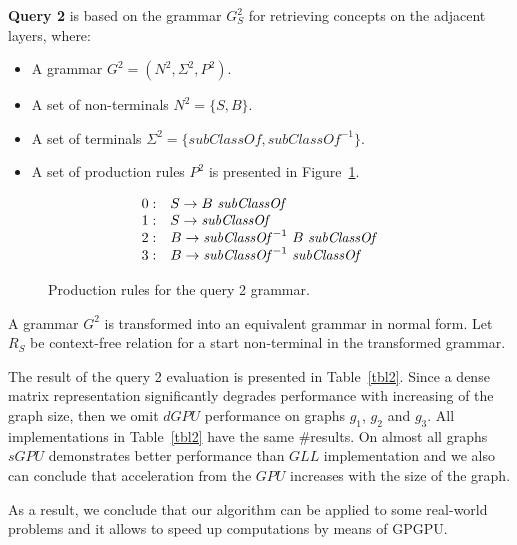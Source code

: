 \textbf{Query 2} is based on the grammar $G^2_S$ for retrieving concepts on the adjacent layers, where:
\begin{itemize}
    \item A grammar $G^2 = (N^2, \Sigma^2, P^2)$.
    \item A set of non-terminals $N^2 = \{S, B\}$.
    \item A set of terminals $\Sigma^2 = \{subClassOf, subClassOf^{-1}\}$.
    \item A set of production rules $P^2$ is presented in Figure~\ref{ProductionRulesQuery2}.
\end{itemize}

\begin{figure}[h]
   \[
\begin{array}{rl}
   0: & S \rightarrow B \ \text{\textit{subClassOf}} \\ 
   1: & S \rightarrow \text{\textit{subClassOf}} \\ 
   2: & B \rightarrow \text{\textit{subClassOf}}^{-1} \ B \ \text{\textit{subClassOf}} \\ 
   3: & B \rightarrow \text{\textit{subClassOf}}^{-1} \ \text{\textit{subClassOf}} \\ 
\end{array}
\]
\caption{Production rules for the query 2 grammar.}
\label{ProductionRulesQuery2}
\end{figure}

A grammar $G^2$ is transformed into an equivalent grammar in normal form. Let $R_S$ be context-free relation for a start non-terminal in the transformed grammar.

The result of the query 2 evaluation is presented in Table~\ref{tbl2}. Since a dense matrix representation significantly degrades performance with increasing of the graph size, then we omit $dGPU$ performance on graphs $g_1$, $g_2$ and $g_3$. All implementations in Table~\ref{tbl2} have the same \#results. On almost all graphs $sGPU$ demonstrates better performance than $GLL$ implementation and we also can conclude that acceleration from the $GPU$ increases with the size of the graph.

As a result, we conclude that our algorithm can be applied to some real-world problems and it allows to speed up computations by means of GPGPU.

